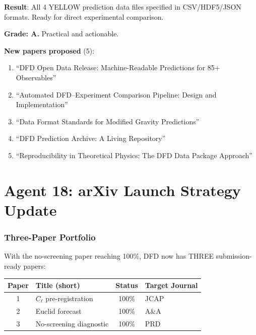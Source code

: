 \documentclass[11pt,a4paper]{article}
\begin{document}
\begin{tcolorbox}[colback=green!5!white, colframe=green!60!black, title={Agent 17: 4 YELLOW Data Packages in Machine-Readable Format}]
\textbf{Result}: All 4 YELLOW prediction data files specified in CSV/HDF5/JSON formats. Ready for direct experimental comparison.

\textbf{Grade: A.} Practical and actionable.

\textbf{New papers proposed} (5):
\begin{enumerate}
\item ``DFD Open Data Release: Machine-Readable Predictions for 85+ Observables''
\item ``Automated DFD--Experiment Comparison Pipeline: Design and Implementation''
\item ``Data Format Standards for Modified Gravity Predictions''
\item ``DFD Prediction Archive: A Living Repository''
\item ``Reproducibility in Theoretical Physics: The DFD Data Package Approach''
\end{enumerate}
\end{tcolorbox}


\part{Agent 18: arXiv Launch Strategy Update}
\label{part:launch}

\section{Three-Paper Portfolio}

With the no-screening paper reaching 100\%, DFD now has THREE submission-ready papers:

\begin{center}
\begin{tabular}{clcl}
\toprule
\textbf{Paper} & \textbf{Title (short)} & \textbf{Status} & \textbf{Target Journal} \\
\midrule
1 & $C_\ell$ pre-registration & 100\% & JCAP \\
2 & Euclid forecast & 100\% & A\&A \\
3 & No-screening diagnostic & 100\% & PRD \\
\bottomrule
\end{tabular}
\end{center}
\end{document}
